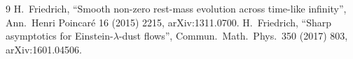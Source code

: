 \documentclass[11pt,a4paper]{article}
\begin{document}
\begin{thebibliography}{9}
 H.~Friedrich, ``Smooth non-zero rest-mass evolution across time-like infinity'', Ann.\ Henri Poincar\'e 16 (2015) 2215, arXiv:1311.0700.
 H.~Friedrich, ``Sharp asymptotics for Einstein-$\lambda$-dust flows'', Commun.\ Math.\ Phys.\ 350 (2017) 803, arXiv:1601.04506.
\end{thebibliography}
\end{document}
